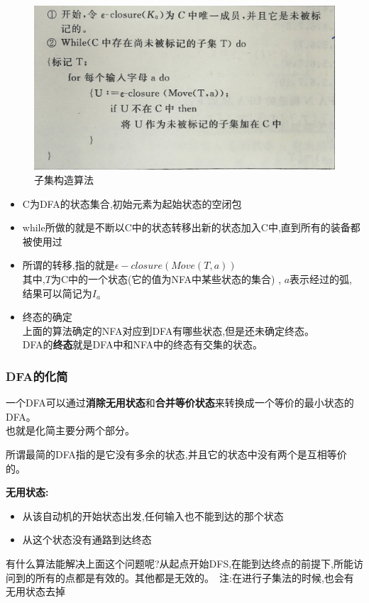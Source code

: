   \begin{figure}[H]
    \centering
    \includegraphics[scale = 0.1]{assets/CompilerConstructionPrinciples_763bd.png}
    \caption{子集构造算法}
    \label{fig-zijifa}
  \end{figure}

  \begin{itemize}
    \item C为DFA的状态集合,初始元素为起始状态的空闭包
    \item while所做的就是不断以C中的状态转移出新的状态加入C中,直到所有的装备都被使用过
    \item 所谓的转移,指的就是$\epsilon-closure(Move(T,a))$\\
    其中,$T$为C中的一个状态(它的值为NFA中某些状态的集合) , $a$表示经过的弧, 结果可以简记为$I_a$
    \item 终态的确定\\
    上面的算法确定的NFA对应到DFA有哪些状态,但是还未确定终态。\\
    DFA的\textbf{终态}就是DFA中和NFA中的终态有交集的状态。
  \end{itemize}

  \subsubsection{DFA的化简}
  一个DFA可以通过\textbf{消除无用状态}和\textbf{合并等价状态}来转换成一个等价的最小状态的DFA。\\
  也就是化简主要分两个部分。

  \spaceline
  所谓最简的DFA指的是它没有多余的状态,并且它的状态中没有两个是互相等价的。

  \spaceline
  \textbf{无用状态:}
  \begin{itemize}
    \item 从该自动机的开始状态出发,任何输入也不能到达的那个状态
    \item 从这个状态没有通路到达终态
  \end{itemize}
  {\color{blue}有什么算法能解决上面这个问题呢?从起点开始DFS,在能到达终点的前提下,所能访问到的所有的点都是有效的。其他都是无效的。\
  注:在进行子集法的时候,也会有无用状态去掉}

